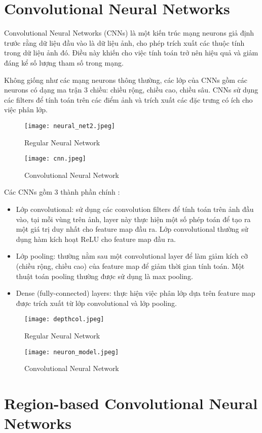 \documentclass[../thesis.tex]{subfiles}
\begin{document}
\section{Convolutional Neural Networks}

Convolutional Neural Networks (CNNs) là một kiến trúc mạng neurons giả định trước rằng dữ liệu đầu vào là dữ liệu ảnh, cho phép trích xuất các thuộc tính trong dữ liệu ảnh đó. Điều này khiến cho việc tính toán trở nên hiệu quả và giảm đáng kể số lượng tham số trong mạng.

Không giống như các mạng neurons thông thường, các lớp của CNNs gồm các neurons có dạng ma trận 3 chiều: chiều rộng, chiều cao, chiều sâu. CNNs sử dụng các filters để tính toán trên các điểm ảnh và trích xuất các đặc trưng có ích cho việc phân lớp.\cite{cs231n}
\begin{figure}[!htb]
	\begin{minipage}{0.48\textwidth}
		\centering
		\texttt{[image: neural\_net2.jpeg]}
		\caption{Regular Neural Network}\label{Fig:NN}
	\end{minipage}\hfill
	\begin {minipage}{0.48\textwidth}
		\centering
		\texttt{[image: cnn.jpeg]}
		\caption{Convolutional Neural Network}\label{Fig:CNN}
	\end{minipage}
\end{figure}

Các CNNs gồm 3 thành phần chính \cite{tfcnn}: 

\begin{itemize}
  \item Lớp convolutional: sử dụng các convolution filters để tính toán trên ảnh đầu vào, tại mỗi vùng trên ảnh, layer này thực hiện một số phép toán để tạo ra một giá trị duy nhất cho feature map đầu ra. Lớp convolutional thường sử dụng hàm kích hoạt ReLU cho feature map đầu ra.
  \item Lớp pooling: thường nằm sau một convolutional layer để làm giảm kích cỡ (chiều rộng, chiều cao) của feature map để giảm thời gian tính toán. Một thuật toán pooling thường được sử dụng là max pooling.
  \item Dense (fully-connected) layers: thực hiện việc phân lớp dựa trên feature map được trích xuất từ lớp convolutional và lớp pooling.
\end{itemize}

\begin{figure}[!htb]
	\begin{minipage}{0.48\textwidth}
		\centering
		\texttt{[image: depthcol.jpeg]}
		\caption{Regular Neural Network}\label{Fig:depthcol}
	\end{minipage}\hfill
	\begin {minipage}{0.48\textwidth}
		\centering
		\texttt{[image: neuron\_model.jpeg]}
		\caption{Convolutional Neural Network}\label{Fig:neural_model}
	\end{minipage}
\end{figure}

\section{Region-based Convolutional Neural Networks}
\end{document}
